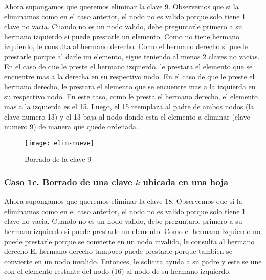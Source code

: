 \documentclass[10pt,a4paper]{article}
\begin{document}
Ahora supongamos que queremos eliminar la clave 9. Observemos que si la eliminamos como en el caso anterior, el nodo no es valido porque solo tiene 1 clave no vacia.
\newline
\newline
Cuando no es un nodo valido, debe preguntarle primero a su hermano izquierdo si puede prestarle un elemento. Como no tiene hermano izquierdo, le consulta al hermano derecho. Como el hermano derecho si puede prestarle porque al darle un elemento, sigue teniendo al menos 2 claves no vacias.
\newline
\newline
En el caso de que le preste el hermano izquierdo, le prestara el elemento que se encuentre mas a la derecha en su respectivo nodo. En el caso de que le preste el hermano derecho, le prestara el elemento que se encuentre mas a la izquierda en su respectivo nodo. En este caso, como le presta el hermano derecho, el elemento mas a la izquierda es el 15.  
\newline
\newline
Luego, el 15 reemplaza al padre de ambos nodos (la clave numero 13) y el 13 baja al nodo donde esta el elemento a eliminar (clave numero 9) de manera que quede ordenada.

\begin{figure}[h]
\centering
\texttt{[image: elim-nueve]}
\caption{Borrado de la clave 9}
\label{drivers1}
\end{figure}

\subsubsection{Caso 1c. Borrado de una clave $k$ ubicada en una hoja}

Ahora supongamos que queremos eliminar la clave 18. Observemos que si la eliminamos como en el caso anterior, el nodo no es valido porque solo tiene 1 clave no vacia.
\newline
\newline
Cuando no es un nodo valido, debe preguntarle primero a su hermano izquierdo si puede prestarle un elemento. Como el hermano izquierdo no puede prestarle porque se convierte en un nodo invalido, le consulta al hermano derecho El hermano derecho tampoco puede prestarle porque tambien se convierte en un nodo invalido.
\newline
\newline
Entonces, le solicita ayuda a su padre y este se une con el elemento restante del nodo (16) al nodo de su hermano izquierdo.
\end{document}
